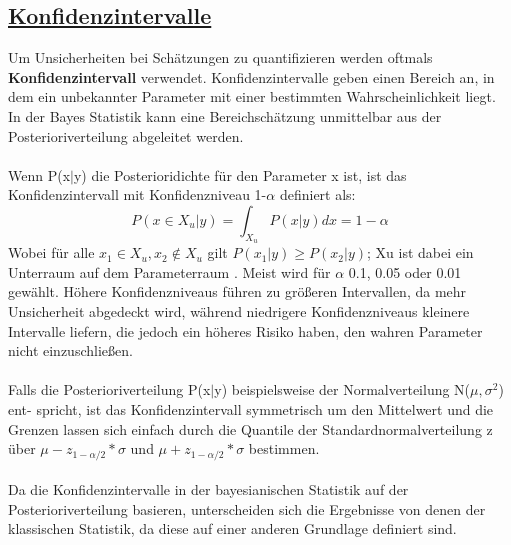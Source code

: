 \documentclass[a4paper,12pt]{article}
\begin{document}
\subsection*{\underline{Konfidenzintervalle}}
Um Unsicherheiten bei Schätzungen zu quantifizieren werden oftmals \textbf{Konfidenzintervall} verwendet. Konfidenzintervalle geben einen Bereich an, in dem ein unbekannter Parameter mit einer bestimmten Wahrscheinlichkeit liegt. In der Bayes Statistik kann eine Bereichschätzung unmittelbar aus der Posterioriverteilung abgeleitet werden. \parencite[71]{EinfBayesStatistik} \\\\
Wenn P(x$|$y) die Posterioridichte für den Parameter x ist, ist das Konfidenzintervall mit Konfidenzniveau 1-$\alpha$ definiert als:
\begin{equation}
  P(x \in X_u|y) = \int_{X_u} P(x|y) dx = 1-\alpha
\end{equation}
Wobei für alle $x_1 \in X_u, x_2 \not\in X_u$ gilt $P(x_1|y) \geq P(x_2|y)$; Xu ist dabei ein Unterraum auf dem Parameterraum \parencite[71]{EinfBayesStatistik}. Meist wird für $\alpha$ 0.1, 0.05 oder 0.01 gewählt. Höhere Konfidenzniveaus führen zu größeren Intervallen, da mehr Unsicherheit abgedeckt wird, während niedrigere Konfidenzniveaus kleinere Intervalle liefern, die jedoch ein höheres Risiko haben, den wahren Parameter nicht einzuschließen. \\\\
Falls die Posterioriverteilung P(x$|$y) beispielsweise der Normalverteilung N($\mu,\sigma^2$) ent- spricht, ist das Konfidenzintervall symmetrisch um den Mittelwert und die Grenzen lassen sich einfach durch die Quantile der Standardnormalverteilung z über $\mu - z_{1-\alpha/2} * \sigma$ und $\mu + z_{1-\alpha/2} * \sigma$ bestimmen.\\\\
Da die Konfidenzintervalle in der bayesianischen Statistik auf der Posterioriverteilung basieren, unterscheiden sich die Ergebnisse von denen der klassischen Statistik, da diese auf einer anderen Grundlage definiert sind.

\newpage
\end{document}
